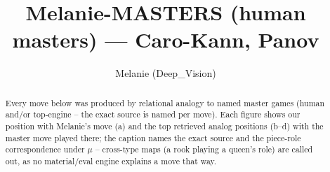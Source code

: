 \documentclass[11pt]{article}
\title{Melanie-MASTERS (human masters) — Caro-Kann, Panov}
\author{Melanie (Deep\_Vision)}
\date{}
\begin{document}
\maketitle

\begin{abstract}Every move below was produced by relational analogy to named master games (human and/or top-engine -- the exact source is named per move). Each figure shows our position with Melanie's move (a) and the top retrieved analog positions (b--d) with the master move played there; the caption names the exact source and the piece-role correspondence under $\mu$ -- cross-type maps (a rook playing a queen's role) are called out, as no material/eval engine explains a move that way.\end{abstract}

\begin{figure}[p]\centering
\begin{subfigure}{0.46\textwidth}\centering
\resizebox{\linewidth}{!}{%
\newchessgame
\chessboard[
  setfen={rnbqk1r1/pp2bppp/4pn2/3p2N1/2PP4/2N5/PP3PPP/R1BQKB1R w KQq - 4 8},
  showmover=false,
  pgfstyle=straightmove, color=movearrow, markmove={c4-d5}
]}
\caption{}
\end{subfigure}\hfill
\begin{subfigure}{0.46\textwidth}\centering
\resizebox{\linewidth}{!}{%
\newchessgame
\chessboard[
  setfen={r1bqk2r/ppb1n1pp/2n1pp2/3p4/1PPN4/P1N1P3/1B3PPP/R2QKB1R w KQkq - 1 11},
  showmover=false,
  pgfstyle=straightmove, color=movearrow, markmove={c4-d5}
]}
\caption{}
\end{subfigure}
\\[4pt]
\begin{subfigure}{0.46\textwidth}\centering
\resizebox{\linewidth}{!}{%
\newchessgame
\chessboard[
  setfen={r2qkb1r/pp3ppp/4bn2/1Np1p3/P2pP3/5Q2/1P1P1PPP/R1B1KB1R w KQkq - 1 11},
  showmover=false,
  pgfstyle=straightmove, color=movearrow, markmove={f3-g3}
]}
\caption{}
\end{subfigure}\hfill
\begin{subfigure}{0.46\textwidth}\centering
\resizebox{\linewidth}{!}{%
\newchessgame
\chessboard[
  setfen={r2qkb1r/pp1b1ppp/4pn2/2p1N3/2PP4/8/PP1B1PPP/R2QKB1R w KQkq - 0 11},
  showmover=false,
  pgfstyle=straightmove, color=movearrow, markmove={d2-e3}
]}
\caption{}
\end{subfigure}

\end{figure}
\end{document}
